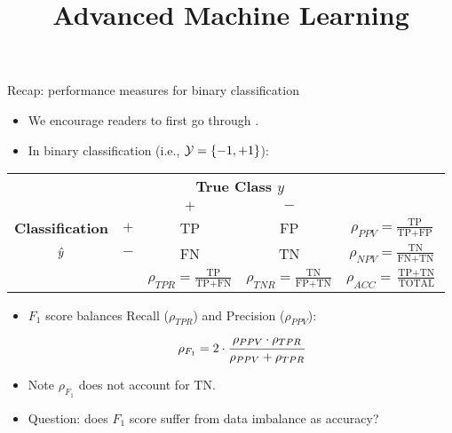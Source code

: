 \documentclass[11pt,compress,t,notes=noshow, xcolor=table]{beamer}
\title{Advanced Machine Learning}
\date{}
\begin{document}



\sloppy

\begin{vbframe}{Recap: performance measures for binary classification}
    \footnotesize{
        \begin{itemize}
            \item We encourage readers to first go through \href{https://slds-lmu.github.io/i2ml/chapters/04_evaluation/04-08-measures-classification/}{}.
            \item In binary classification  (i.e., $\mathcal{Y} = \{-1,+1\}$):

		\end{itemize}
		
		\begin{center}
		\tiny
		\renewcommand{\arraystretch}{1.1}
		\begin{tabular}{cc||cc|c}
			& & \multicolumn{2}{c|}{\bfseries True Class $y$} & \\
			& & $+$ & $-$ & \\ 
			\hline \hline
			\bfseries Classification     & $+$ & TP & FP & $\rho_{PPV} = \frac{\text{TP}}{\text{TP} + \text{FP}}$\\
			$\hat{y}$ & $-$ & FN & TN & $\rho_{NPV} = \frac{\text{TN}}{\text{FN} + \text{TN}}$\\
			\hline
			& & $\rho_{TPR} = \frac{\text{TP}}{\text{TP} + \text{FN}}$ & $\rho_{TNR} = \frac{\text{TN}}{\text{FP} + \text{TN}}$ & $\rho_{ACC} = \frac{\text{TP}+ \text{TN}}{\text{TOTAL}}$
		\end{tabular}
		\renewcommand{\arraystretch}{1}
        \end{center}

        \begin{itemize}
            \item $F_1$ score balances Recall ($\rho_{TPR}$) and Precision ($\rho_{PPV}$):
            $$\rho_{F_1} = 2 \cdot \cfrac{\rho_{PPV} \cdot \rho_{TPR}}{\rho_{PPV} + \rho_{TPR}}$$
            
            \item Note $\rho_{F_1}$ does not account for TN.
            
            \item Question: does $F_1$ score suffer from data imbalance as accuracy?
        \end{itemize}
            
    }
    
\end{vbframe}
\end{document}
